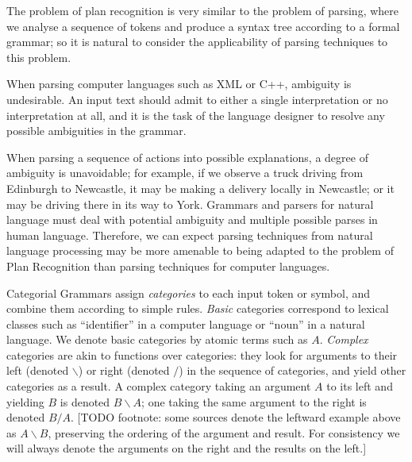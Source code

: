 The problem of plan recognition is very similar to the problem of parsing, where we analyse a sequence of tokens and produce a syntax tree according to a formal grammar; so it is natural to consider the applicability of parsing techniques to this problem.

When parsing computer languages such as XML or C++, ambiguity is undesirable. An input text should admit to either a single interpretation or no interpretation at all, and it is the task of the language designer to resolve any possible ambiguities in the grammar.

When parsing a sequence of actions into possible explanations, a degree of ambiguity is unavoidable; for example, if we observe a truck driving from Edinburgh to Newcastle, it may be making a delivery locally in Newcastle; or it may be driving there in its way to York. Grammars and parsers for natural language must deal with potential ambiguity and multiple possible parses in human language. Therefore, we can expect parsing techniques from natural language processing may be more amenable to being adapted to the problem of Plan Recognition than parsing techniques for computer languages.


Categorial Grammars assign \emph{categories} to each input token or symbol, and combine them according to simple rules. \emph{Basic} categories correspond to lexical classes such as ``identifier'' in a computer language or ``noun'' in a natural language. We denote basic categories by atomic terms such as $A$. \emph{Complex} categories are akin to functions over categories: they look for arguments to their left (denoted $\backslash$) or right (denoted $/$) in the sequence of categories, and yield other categories as a result. A complex category taking an argument $A$ to its left and yielding $B$ is denoted $B\backslash A$; one taking the same argument to the right is denoted $B/A$. [TODO footnote: some sources denote the leftward example above as $A\backslash B$, preserving the ordering of the argument and result. For consistency we will always denote the arguments on the right and the results on the left.]

